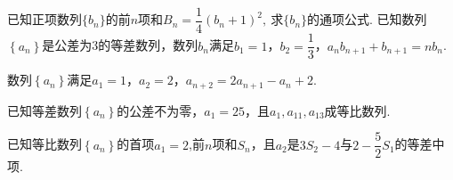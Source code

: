 \documentclass{BHCexam}
\begin{document}
\begin{questions}
\kongbai
\qs 已知正项数列$ \{b_n\} $的前$n$项和$ B_n=\dfrac{1}{4}(b_n+1)^2,~$求$\{b_n\}$的通项公式.
\kongbai
\question
已知数列$\left\{a_n\right\}$是公差为3的等差数列，数列${b_n}$满足$b_1=1$，$b_2=\dfrac{1}{3}$，$a_nb_{n+1}+b_{n+1}=nb_n$.
\newpage
\qs 数列$\left\{a_n\right\}$满足$a_1=1$，$a_2=2$，$a_{n+2}=2a_{n+1}-a_n+2$.
\kongbai
\qs 已知等差数列$\left\{a_n\right\}$的公差不为零，$a_1=25$，且$a_1,a_{11},a_{13}$成等比数列.
\newpage
\qs
已知等比数列$\left\{a_n\right\}$的首项$a_1=2$,前$ n $项和$ S_n $，且$ a_2 $是$ 3S_2-4 $与$ 2-\dfrac{5}{2}S_1 $的等差中项.
\end{questions}
\end{document}
